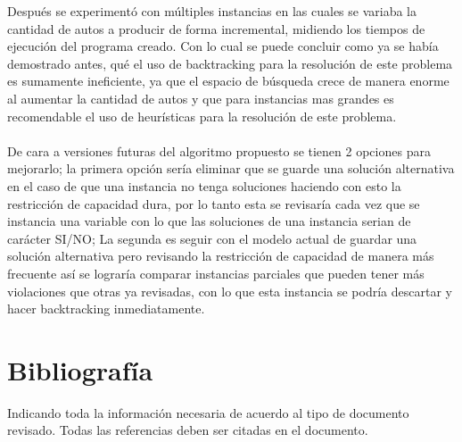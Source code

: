 \documentclass[letter, 10pt]{article}
\begin{document}
Despu\'es se experiment\'o con m\'ultiples instancias en las cuales se variaba la cantidad de autos a producir de forma incremental, midiendo los tiempos de ejecuci\'on del programa creado. Con lo cual se puede concluir como ya se hab\'ia demostrado antes, qu\'e el uso de backtracking para la resoluci\'on de este problema es sumamente ineficiente, ya que el espacio de b\'usqueda crece de manera enorme al aumentar la cantidad de autos y que para instancias mas grandes es recomendable el uso de heur\'isticas para la resoluci\'on de este problema.
\\\\
De cara a versiones futuras del algoritmo propuesto se tienen 2 opciones para mejorarlo; la primera opci\'on ser\'ia eliminar que se guarde una soluci\'on alternativa en el caso de que una instancia no tenga soluciones haciendo con esto la restricci\'on de capacidad dura, por lo tanto esta se revisar\'ia cada vez que se instancia una variable con lo que las soluciones de una instancia serian de car\'acter SI/NO; La segunda es seguir con el modelo actual de guardar una soluci\'on alternativa pero revisando la restricci\'on de capacidad de manera m\'as frecuente as\'i se lograr\'ia comparar instancias parciales que pueden tener m\'as violaciones que otras ya revisadas, con lo que esta instancia se podr\'ia descartar y hacer backtracking inmediatamente.
\section{Bibliograf\'ia}
Indicando toda la informaci\'on necesaria de acuerdo al tipo de documento revisado. Todas las referencias deben ser citadas en el documento.



\end{document}
